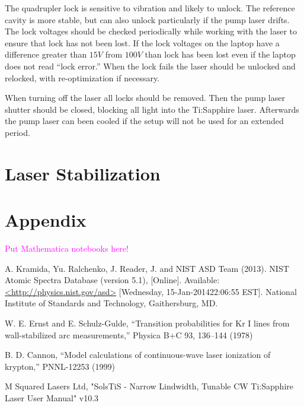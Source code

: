 \documentclass[prb,preprint]{revtex4-1}
\begin{document}
The quadrupler lock is sensitive to vibration and likely to unlock. The reference cavity is more stable, but can also unlock particularly if the pump laser drifts. The lock voltages should be checked periodically while working with the laser to ensure that lock has not been lost. If the lock voltages on the laptop have a difference greater than $15 V$ from $100 V$ than lock has been lost even if the laptop does not read ``lock error.'' When the lock fails the laser should be unlocked and relocked, with re-optimization if necessary.

When turning off the laser all locks should be removed. Then the pump laser shutter should be closed, blocking all light into the Ti:Sapphire laser. Afterwards the pump laser can been cooled if the setup will not be used for an extended period.

\section{Laser Stabilization}

\section{Appendix}

\textcolor{magenta}{Put Mathematica notebooks here!}


\begin{thebibliography}{2}

 A. Kramida, Yu. Ralchenko, J. Reader, J. and NIST ASD Team (2013). NIST Atomic Spectra Database (version 5.1), [Online]. Available: \url{<http://physics.nist.gov/asd>} [Wednesday, 15-Jan-201422:06:55 EST]. National Institute of Standards and Technology, Gaithersburg, MD.

 W. E. Ernst and E. Schulz-Gulde, ``Transition probabilities for Kr I lines from wall-stabilized arc measurements,'' Physica B+C 93, 136–144 (1978)

 B. D. Cannon, ``Model calculations of continuous-wave laser ionization of krypton,'' PNNL-12253 (1999)

 M Squared Lasers Ltd, "SolsTiS - Narrow Lindwidth, Tunable CW Ti:Sapphire Laser User Manual" v10.3

\end{thebibliography}
\end{document}

